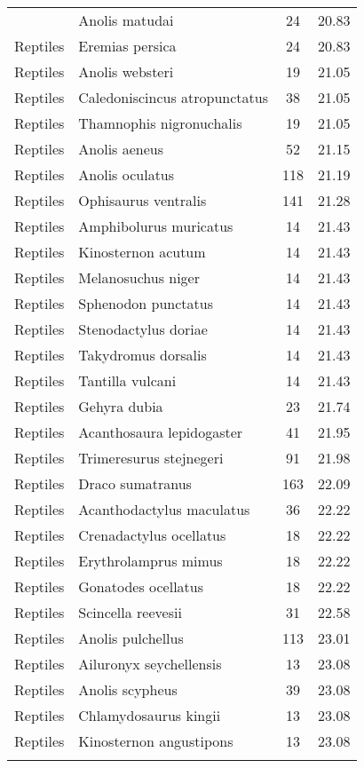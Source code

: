 \begin{longtable}{llcc}
{  Reptiles & Anolis matudai &  24 & 20.83 \\ 
  Reptiles & Eremias persica &  24 & 20.83 \\ 
  Reptiles & Anolis websteri &  19 & 21.05 \\ 
  Reptiles & Caledoniscincus atropunctatus &  38 & 21.05 \\ 
  Reptiles & Thamnophis nigronuchalis &  19 & 21.05 \\ 
  Reptiles & Anolis aeneus &  52 & 21.15 \\ 
  Reptiles & Anolis oculatus & 118 & 21.19 \\ 
  Reptiles & Ophisaurus ventralis & 141 & 21.28 \\ 
  Reptiles & Amphibolurus muricatus &  14 & 21.43 \\ 
  Reptiles & Kinosternon acutum &  14 & 21.43 \\ 
  Reptiles & Melanosuchus niger &  14 & 21.43 \\ 
  Reptiles & Sphenodon punctatus &  14 & 21.43 \\ 
  Reptiles & Stenodactylus doriae &  14 & 21.43 \\ 
  Reptiles & Takydromus dorsalis &  14 & 21.43 \\ 
  Reptiles & Tantilla vulcani &  14 & 21.43 \\ 
  Reptiles & Gehyra dubia &  23 & 21.74 \\ 
  Reptiles & Acanthosaura lepidogaster &  41 & 21.95 \\ 
  Reptiles & Trimeresurus stejnegeri &  91 & 21.98 \\ 
  Reptiles & Draco sumatranus & 163 & 22.09 \\ 
  Reptiles & Acanthodactylus maculatus &  36 & 22.22 \\ 
  Reptiles & Crenadactylus ocellatus &  18 & 22.22 \\ 
  Reptiles & Erythrolamprus mimus &  18 & 22.22 \\ 
  Reptiles & Gonatodes ocellatus &  18 & 22.22 \\ 
  Reptiles & Scincella reevesii &  31 & 22.58 \\ 
  Reptiles & Anolis pulchellus & 113 & 23.01 \\ 
  Reptiles & Ailuronyx seychellensis &  13 & 23.08 \\ 
  Reptiles & Anolis scypheus &  39 & 23.08 \\ 
  Reptiles & Chlamydosaurus kingii &  13 & 23.08 \\ 
  Reptiles & Kinosternon angustipons &  13 & 23.08 \\ 
}
\end{longtable}

